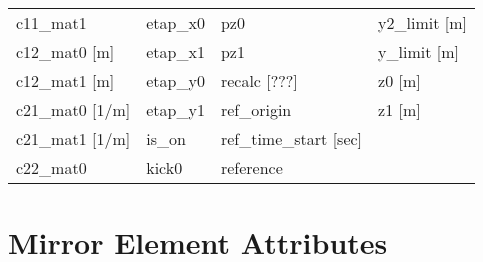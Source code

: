 \begin{tabular}{llll}
c11_mat1                         & etap_x0                          & pz0                              & y2_limit [m]                     \\
c12_mat0 [m]                     & etap_x1                          & pz1                              & y_limit [m]                      \\
c12_mat1 [m]                     & etap_y0                          & recalc [???]                     & z0 [m]                           \\
c21_mat0 [1/m]                   & etap_y1                          & ref_origin                       & z1 [m]                           \\
c21_mat1 [1/m]                   & is_on                            & ref_time_start [sec]             &                                  \\
c22_mat0                         & kick0                            & reference                        &                                  \\
 \bottomrule
 \end{tabular}
 \vfill
 
 \section{Mirror Element Attributes}
 \label{s:list.mirror}
 
